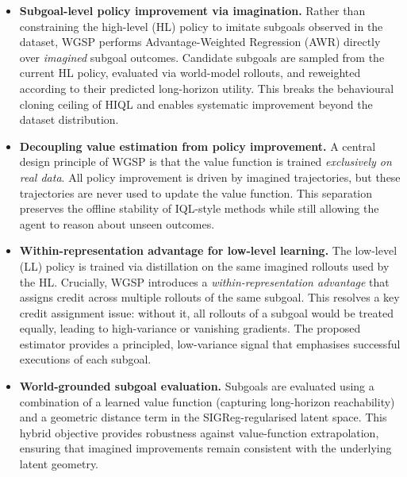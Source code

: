 \begin{itemize}
    \item \textbf{Subgoal-level policy improvement via imagination.}
    Rather than constraining the high-level (HL) policy to imitate
    subgoals observed in the dataset, WGSP performs
    Advantage-Weighted Regression (AWR) directly over \emph{imagined}
    subgoal outcomes. Candidate subgoals are sampled from the current
    HL policy, evaluated via world-model rollouts, and reweighted
    according to their predicted long-horizon utility. This breaks the
    behavioural cloning ceiling of HIQL and enables systematic
    improvement beyond the dataset distribution.

    \item \textbf{Decoupling value estimation from policy improvement.}
    A central design principle of WGSP is that the value function is
    trained \emph{exclusively on real data}. All policy improvement is
    driven by imagined trajectories, but these trajectories are never
    used to update the value function. This separation preserves the
    offline stability of IQL-style methods while still allowing the
    agent to reason about unseen outcomes.

    \item \textbf{Within-representation advantage for low-level learning.}
    The low-level (LL) policy is trained via distillation on the same
    imagined rollouts used by the HL. Crucially, WGSP introduces a
    \emph{within-representation advantage} that assigns credit across
    multiple rollouts of the same subgoal. This resolves a key credit
    assignment issue: without it, all rollouts of a subgoal would be
    treated equally, leading to high-variance or vanishing gradients.
    The proposed estimator provides a principled, low-variance signal
    that emphasises successful executions of each subgoal.

    \item \textbf{World-grounded subgoal evaluation.}
    Subgoals are evaluated using a combination of a learned value
    function (capturing long-horizon reachability) and a geometric
    distance term in the SIGReg-regularised latent space. This hybrid
    objective provides robustness against value-function
    extrapolation, ensuring that imagined improvements remain
    consistent with the underlying latent geometry.

\end{itemize}

